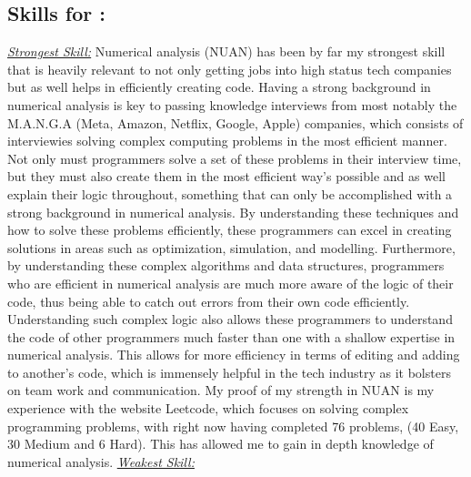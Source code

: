 \documentclass[a4paper, 11pt]{report}
\begin{document}
\subsection{Skills for \majA: \studC}
\underline{\emph{Strongest Skill:}}\newline
Numerical analysis (NUAN)\cite{SFIA} has been by far my strongest skill that is heavily relevant to not only getting jobs into high status tech companies but as well helps in efficiently creating code. Having a strong background in numerical analysis is key to passing knowledge interviews from most notably the M.A.N.G.A (Meta, Amazon, Netflix, Google, Apple) companies, which consists of interviewies solving complex computing problems in the most efficient manner. Not only must programmers solve a set of these problems in their interview time, but they must also create them in the most efficient way's possible and as well explain their logic throughout, something that can only be accomplished with a strong background in numerical analysis. By understanding these techniques and how to solve these problems efficiently, these programmers can excel in creating solutions in areas such as optimization, simulation, and modelling. Furthermore, by understanding these complex algorithms and data structures, programmers who are efficient in numerical analysis are much more aware of the logic of their code, thus being able to catch out errors from their own code efficiently. Understanding such complex logic also allows these programmers to understand the code of other programmers much faster than one with a shallow expertise in numerical analysis. This allows for more efficiency in terms of editing and adding to another's code, which is immensely helpful in the tech industry as it bolsters on team work and communication. My proof of my strength in NUAN is my experience with the website Leetcode, which focuses on solving complex programming problems, with right now having completed 76 problems, (40 Easy, 30 Medium and 6 Hard). This has allowed me to gain in depth knowledge of numerical analysis. \newline\newline
\underline{\emph{Weakest Skill:}}\newline
\end{document}
